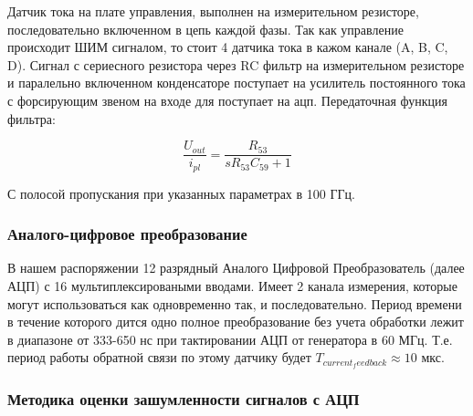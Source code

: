 Датчик тока на плате управления, выполнен на измерительном резисторе, последовательно
включенном в цепь каждой фазы. Так как управление происходит ШИМ сигналом, то стоит 4
датчика тока в кажом канале (A, B, C, D).
Сигнал с сериесного резистора через RC фильтр на измерительном резисторе и паралельно включенном
конденсаторе поступает на усилитель постоянного тока с форсирующим звеном на входе для поступает на ацп.
Передаточная функция фильтра:

$$
    \frac{ U_{out} }{ i_{pl} } = \frac{ R_{53} }{ s R_{53} C_{59} + 1 }
$$

С полосой пропускания при указанных параметрах в 100 ГГц.

\subsubsection{ Аналого-цифровое преобразование }
В нашем распоряжении 12 разрядный Аналого Цифровой Преобразователь (далее АЦП) с 16
мультиплексироваными вводами.
Имеет 2 канала измерения, которые могут использоваться как одновременно так, и последовательно.
Период времени в течение которого дится одно полное преобразование без учета обработки лежит в
диапазоне от 333-650 нс при тактировании АЦП от генератора в 60 МГц.
Т.е. период работы обратной связи по этому датчику будет $ T_{current_feedback} \approx 10 $ мкс.
\subsubsection{ Методика оценки зашумленности сигналов с АЦП }

\endinput

